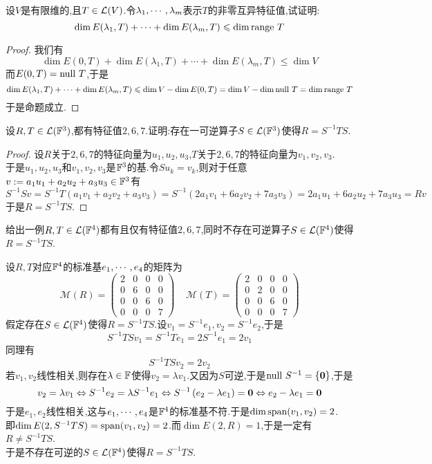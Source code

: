 \documentclass{ctexart}
\begin{document}
\begin{problem}[8.]
    设$V$是有限维的,且$T\in\mathcal{L}(V)$.令${\lambda}_1,\cdots,{\lambda}_{m}$表示$T$的非零互异特征值,试证明:
    \[\dim E(\lambda_1,T)+\cdots+\dim E(\lambda_m,T)\leqslant\dim\text{range } T\]
\end{problem}
\begin{proof}
    我们有
    \[\dim E(0,T)+\dim E(\lambda_1,T)+\cdots+\dim E(\lambda_m,T)\leqslant\dim V\]
    而$E(0,T)=\text{null } T$,于是
    \[\dim E(\lambda_1,T)+\cdots+\dim E(\lambda_m,T)\leqslant\dim V-\dim E(0,T)=\dim V-\dim\text{null } T=\dim\text{range } T\]
    于是命题成立.
\end{proof}
\begin{problem}[9.]
    设$R,T\in\mathcal{L}(\mathbb{F}^3)$,都有特征值$2,6,7$.证明:存在一可逆算子$S\in\mathcal{L}(\mathbb{F}^3)$使得$R=S^{-1}TS$.
\end{problem}
\begin{proof}
    设$R$关于$2,6,7$的特征向量为$u_1,u_2,u_3$,$T$关于$2,6,7$的特征向量为$v_1,v_2,v_3$.\\
    于是$u_1,u_2,u_3$和$v_1,v_2,v_3$是$\mathbb{F}^3$的基.令$Su_k=v_k$,则对于任意$v:=a_1u_1+a_2u_2+a_3u_3\in\mathbb{F}^3$有
    \[S^{-1}Sv=S^{-1}T(a_1v_1+a_2v_2+a_3v_3)=S^{-1}(2a_1v_1+6a_2v_2+7a_3v_3)=2a_1u_1+6a_2u_2+7a_3u_3=Rv\]
    于是$R=S^{-1}TS$.
\end{proof}
\begin{problem}[10.]
    给出一例$R,T\in\mathcal{L}(\mathbb{F}^4)$都有且仅有特征值$2,6,7$,同时不存在可逆算子$S\in\mathcal{L}(\mathbb{F}^4)$使得$R=S^{-1}TS$.
\end{problem}
\begin{solution}
    设$R,T$对应$\mathbb{F}^4$的标准基${e}_1,\cdots,{e}_{4}$的矩阵为
    \[\mathcal{M}(R)=\begin{pmatrix}
        2&0&0&0\\0&6&0&0\\0&0&6&0\\0&0&0&7
    \end{pmatrix}\ \ \ \ \ 
    \mathcal{M}(T)=\begin{pmatrix}
        2&0&0&0\\0&2&0&0\\0&0&6&0\\0&0&0&7
    \end{pmatrix}\]
    假定存在$S\in\mathcal{L}(\mathbb{F}^4)$使得$R=S^{-1}TS$.设$v_1=S^{-1}e_1,v_2=S^{-1}e_2$,于是
    \[S^{-1}TSv_1=S^{-1}Te_1=2S^{-1}e_1=2v_1\]
    同理有
    \[S^{-1}TSv_2=2v_2\]
    若$v_1,v_2$线性相关,则存在$\lambda\in\mathbb{F}$使得$v_2=\lambda v_1$.又因为$S$可逆,于是$\text{null } S^{-1}=\{\mathbf0\}$,于是
    \[v_2=\lambda v_1\Leftrightarrow S^{-1}e_2=\lambda S^{-1}e_1 \Leftrightarrow S^{-1}\left(e_2-\lambda e_1\right)=\mathbf0\Leftrightarrow e_2-\lambda e_1=\mathbf0\]
    于是$e_1,e_2$线性相关,这与${e}_1,\cdots,{e}_{4}$是$\mathbb{F}^4$的标准基不符.于是$\dim\text{span}(v_1,v_2)=2$.\\
    即$\dim E(2,S^{-1}TS)=\text{span}(v_1,v_2)=2$.而$\dim E(2,R)=1$,于是一定有$R\neq S^{-1}TS$.\\
    于是不存在可逆的$S\in\mathcal{L}(\mathbb{F}^4)$使得$R=S^{-1}TS$.
\end{solution}
\end{document}
